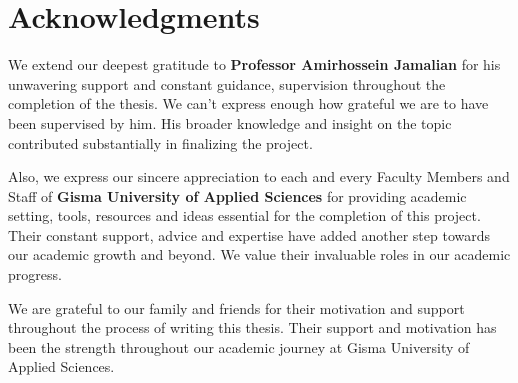 \chapter*{Acknowledgments}

We extend our deepest gratitude to \textbf {Professor Amirhossein Jamalian} for his unwavering support and constant guidance, supervision throughout the completion of the thesis. 
We can't express enough how grateful we are to have been supervised by him. His broader knowledge and insight on the topic contributed substantially in finalizing the project. 

Also, we express our sincere appreciation to each and every Faculty Members and Staff of \textbf{Gisma University of Applied Sciences} for providing academic setting, tools, resources
and ideas essential for the completion of this project. Their constant support, advice and expertise have added another step towards our academic growth and beyond. We value their invaluable
roles in our academic progress.

We are grateful to our family and friends for their motivation and support throughout the process of writing this thesis. Their support and motivation has been the strength throughout our 
academic journey at Gisma University of Applied Sciences. 